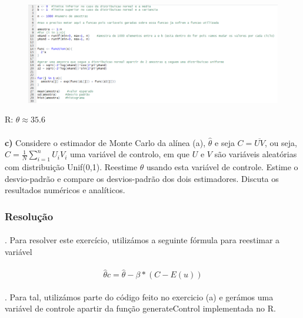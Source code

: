\documentclass{article}
\begin{document}
				\paragraph{}
					\begin{figure}[!h]
						\includegraphics[scale=0.75]{ex2b)}
					\end{figure}		
					\indent R: $\theta \approx 35.6$

			\paragraph{}
			\textbf{c)} Considere o estimador de Monte Carlo da alínea (a), $\hat{\theta}$ e seja $C=\overline{UV}$, ou seja, $C=\frac{1}{N}\sum\limits_{i=1}^n{U_{i}V_{i}}$ uma variável de controlo, em que $U$ e $V$ são variáveis aleatórias com distribuição Unif(0,1). Reestime $\theta$ usando esta variável de controle. Estime o desvio-padrão e compare os desvios-padrão dos dois estimadores. Discuta os resultados numéricos e analíticos. 
	
				\subsubsection*{Resolução}
				\paragraph{}
					. Para resolver este exercício, utilizámos a seguinte fórmula para reestimar a variável 
				\paragraph{}
					\begin{equation*}
					     \hat{\theta}c =  \hat{\theta} - \beta*(C - E(u))
					\end{equation*}
				\paragraph{}
					. Para tal, utilizámos parte do código feito no exercicio (a) e gerámos uma variável de controle apartir da função generateControl implementada no R.
\end{document}
